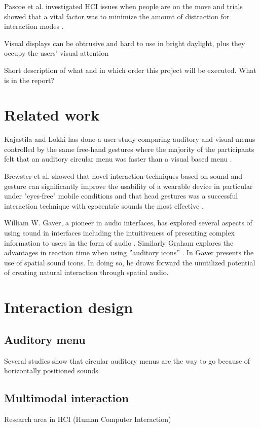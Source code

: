 \documentclass{article}
\begin{document}
Pascoe et al. investigated HCI issues when people are on the move and trials showed that a vital factor was to minimize the amount of distraction for interaction modes \cite{pascoe_using_2000}.

Visual displays can be obtrusive and hard to use in bright daylight, plus they occupy the users’ visual attention \cite{geelhoed_safety_2000}

Short description of what and in which order this project will be executed. What is in the report?


\section{Related work}
Kajastila and Lokki has done a user study comparing auditory and visual menus controlled by the same free-hand gestures where the majority of the participants felt that an auditory circular menu was faster than a visual based menu \cite{kajastila_interaction_2013}.

Brewster et al. showed that novel interaction techniques based on sound and gesture can significantly improve the usability of a wearable device in particular under "eyes-free" mobile conditions and that head gestures was a successful interaction technique with egocentric sounds the most effective \cite{brewster_multimodaleyes-freeinteraction_2003}.

William W. Gaver, a pioneer in audio interfaces, has explored several aspects of using sound in interfaces including the intuitiveness of presenting complex information to users in the form of audio \cite{gaver_sonicfinder:_1989}. Similarly Graham explores the advantages in reaction time when using ”auditory icons” \cite{graham_use_1999}. In \cite{gaver_auditory_1986} Gaver presents the use of spatial sound icons. In doing so, he draws forward the unutilized potential of creating natural interaction through spatial audio.


\section{Interaction design}

\subsection{Auditory menu}
Several studies show that circular auditory menus are the way to go because of horizontally positioned sounds 

\subsection{Multimodal interaction}
Research area in HCI (Human Computer Interaction)
\end{document}
